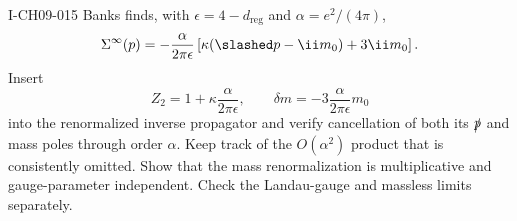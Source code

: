 \begin{exercise}{I-CH09-015}
Banks finds, with $\epsilon=4-d_{\mathrm{reg}}$ and
$\alpha=e^2/(4\pi)$,
\[
  \Sigma^\infty(p)=-\frac{\alpha}{2\pi\epsilon}
  \left[\kappa(\slashed p-\ii m_0)+3\ii m_0\right].
\]
Insert
\[
  Z_2=1+\kappa\frac{\alpha}{2\pi\epsilon},
  \qquad
  \delta m=-3\frac{\alpha}{2\pi\epsilon}m_0
\]
into the renormalized inverse propagator and verify cancellation of both its
$\slashed p$ and mass poles through order $\alpha$.  Keep track of the
$O(\alpha^2)$ product that is consistently omitted.  Show that the mass
renormalization is multiplicative and gauge-parameter independent.  Check the
Landau-gauge and massless limits separately.
\end{exercise}
